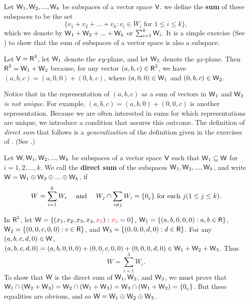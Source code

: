 \begin{definition} \label{def 5.8}
Let \(\textsf{W}_1, \textsf{W}_2, ..., \textsf{W}_k\) be subspaces of a vector space \(\textsf{V}\). we define the \textbf{sum} of these subspaces to be the set
\[
    \{ v_1 + v_2 + ... + v_k : v_i \in W_i \text{ for } 1 \le i \le k \},
\]
which we denote by \(\textsf{W}_1 + \textsf{W}_2 + ... + \textsf{W}_k\) or \(\sum_{i = 1}^k \textsf{W}_i\).
It is a simple exercise (See ) to show that the sum of subspaces of a vector space is also a subspace.
\end{definition}

\begin{example} \label{example 5.2.8}
Let \(\textsf{V} = \textsf{R}^3\), let \(\textsf{W}_1\) denote the \(xy\)-plane, and let \(\textsf{W}_2\) denote the \(yz\)-plane.
Then \(\textsf{R}^3 = \textsf{W}_1 + \textsf{W}_2\) because, for any vector \((a, b, c) \in \textsf{R}^3\),
we have \((a, b, c) = (a, 0, 0) + (0, b, c)\), where \((a, 0, 0) \in \textsf{W}_1\) and \((0, b, c) \in \textsf{W}_2\).
\end{example}

Notice that in  the representation of \((a, b, c)\) as a sum of vectors in \(\textsf{W}_1\) and \(\textsf{W}_2\) \emph{is not unique}.
For example, \((a, b, c) = (a, b, 0) + (0, 0, c)\) is
another representation.
Because we are often interested in sums for which representations are unique, we introduce a condition that assures this outcome.
The definition of \emph{direct sum} that follows is a \emph{generalization} of the definition given in the exercises of .
(See .)

\begin{definition} \label{def 5.9}
Let \(\textsf{W}, \textsf{W}_1, \textsf{W}_2, ..., \textsf{W}_k\) be subspaces of a vector space \(\textsf{V}\) such that \(\textsf{W}_1 \subseteq \textsf{W}\) for \(i = 1, 2, ..., k\).
We call \W the \textbf{direct sum} of the subspaces \(\textsf{W}_1, \textsf{W}_2, ..., \textsf{W}_k\), and write \(\textsf{W} = \textsf{W}_1 \oplus \textsf{W}_2 \oplus ... \oplus \textsf{W}_k\), if
\[
    W = \sum_{i = 1}^k W_i \quad \text{ and } \quad W_j \cap \sum_{i \ne j} W_i = \{ 0_{_{\textsf{V}}} \} \text{ for each } j (1 \le j \le k).
\]
\end{definition}

\begin{example} \label{example 5.2.9}
In \(\textsf{R}^5\), let \(\W = \{(x_1, x_2, x_3, x_4, \RED{x_5}) : \RED{x_5} = 0 \}\),
\(\textsf{W}_1 = \{(a, b, 0, 0, 0): a, b \in \textsf{R} \}\), \(\textsf{W}_2 = \{ (0, 0, c, 0, 0): c \in \textsf{R}\}\),
and \(\textsf{W}_3 = \{(0, 0, 0, d, 0): d \in \textsf{R} \}\).
For any \((a, b, c, d, 0) \in \textsf{W}\),
\((a, b, c, d, 0) = (a, b, 0, 0, 0) + (0, 0, c, 0, 0) + (0, 0, 0, d, 0) \in \textsf{W}_1 + \textsf{W}_2 + \textsf{W}_3\).
Thus
\[
    W = \sum_{i = 1}^3 W_i.
\]
To show that \(\textsf{W}\) is the direct sum of \(\textsf{W}_1, \textsf{W}_2\), and \(\textsf{W}_3\), we must prove that \(\textsf{W}_1 \cap (\textsf{W}_2 + \textsf{W}_3) = \textsf{W}_2 \cap (\textsf{W}_1 + \textsf{W}_3) = \textsf{W}_3 \cap (\textsf{W}_1 + \textsf{W}_2) = \{ 0_{_{\textsf{V}}} \}\).
But these equalities are obvious, and so \(\textsf{W} = \textsf{W}_1 \oplus \textsf{W}_2 \oplus \textsf{W}_3\).
\end{example}

